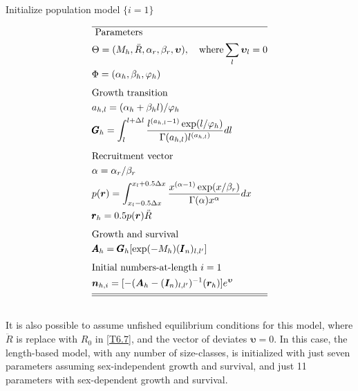 \documentclass[12pt,letterpaper]{article}
\newcounter{saveEq}
\def\putEq{\setcounter{saveEq}{\value{equation}}}
\def\getEq{\setcounter{equation}{\value{saveEq}}}
\def\tableEq{ %
    \putEq \setcounter{equation}{0}
    \renewcommand{\theequation}{T\arabic{table}.\arabic{equation}}
    \vspace{-5mm}
    }
\def\normalEq{ %
    \getEq
    \renewcommand{\theequation}{\arabic{section}.\arabic{equation}}}
\begin{document}
      \begin{table}
      \centering
      \caption{ Initialize population model $\{i=1\}$ }
      \label{tab:initial_numbers}
      \tableEq
      \begin{align}
        \hline \nonumber
        &\mbox{ Parameters } \\
        &\Theta = (M_h,\ddot{R},\alpha_r,\beta_r, \bm{\upsilon})
        ,\quad\mbox{where} \sum_l \bm{\upsilon}_l = 0 \label{T6.1} \\
        &\Phi = (\alpha_h,\beta_h,\varphi_h)\\[1ex]
        &\mbox{Growth transition}\nonumber \\
        &a_{h,l} = (\alpha_h + \beta_h l)/\varphi_h \label{T6.3} \\
        &\pmb{G}_h= \int_{l}^{l+\Delta l}
        \frac{ l^{(a_{h,l}-1)} \exp(l/\varphi_h) }
        { \Gamma(a_{h,l}) l^{(a_{h,l})} } dl \label{T6.4} \\[1ex]
        &\mbox{Recruitment vector} \nonumber \\
        & \alpha = \alpha_r / \beta_r \label{T6.5} \\
        &p(\boldsymbol{r}) = \int_{x_l-0.5\Delta x}^{x_l+0.5\Delta x}
        \frac{x^{(\alpha-1)}\exp(x / \beta_r)}{\Gamma(\alpha)x^\alpha}dx
        \label{T6.6}\\
        &\pmb{r}_h = 0.5 p(\boldsymbol{r}) \ddot{R} \label{T6.7}\\[1ex]
         &\mbox{Growth and survival} \nonumber \\
        &\pmb{A}_h = \pmb{G}_h [\exp(-M_h) (\pmb{I}_n)_{l,l'}]\label{T6.8}\\[1ex]
        &\mbox{Initial numbers-at-length $i=1$} \nonumber \\
        &\bm{n}_{h,i} = [-(\bm{A}_h - (\bm{I}_n)_{l,l'})^{-1} (\bm{r}_h)] e^{\bm{\upsilon}} \label{T6.9}\\[1ex]
        \hline \hline \nonumber
      \end{align}
      \normalEq
      \end{table}

      It is also possible to assume unfished equilibrium conditions for this model, where $\ddot{R}$ is replace with $R_0$ in \eqref{T6.7}, and the vector of deviates $\bm{\upsilon} = 0$.  In this case, the length-based model, with any number of size-classes, is initialized with just seven parameters assuming sex-independent growth and survival, and just 11 parameters with sex-dependent growth and survival.
\end{document}

